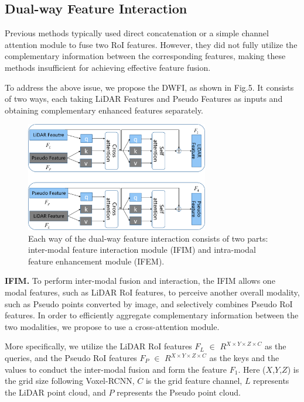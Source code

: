 \begin{sloppypar}
\subsection{Dual-way Feature Interaction}
Previous methods typically used direct concatenation or a simple channel attention module to fuse two RoI features. However, they did not fully utilize the complementary information between the corresponding features, making these methods insufficient for achieving effective feature fusion.

To address the above issue, we propose the DWFI, as shown in Fig.5. It consists of two ways, each taking LiDAR Features and Pseudo Features as inputs and obtaining complementary enhanced features separately.
\begin{figure}[h]
\centering
\includegraphics[width=8cm]{new_images/fig15.png}
\caption{Each way of the dual-way feature interaction consists of two parts: inter-modal feature interaction module (IFIM) and intra-modal feature enhancement module (IFEM).}
\label{fig_sim}
\end{figure}

{\bfseries IFIM.} To perform inter-modal fusion and interaction, the IFIM allows one modal features, such as LiDAR RoI features, to perceive another overall modality, such as Pseudo points converted by image, and selectively combines Pseudo RoI features. In order to efficiently aggregate complementary information between the two modalities, we propose to use a cross-attention module\cite{30}.

More specifically, we utilize the LiDAR RoI features  $F_L$ $\in$ $R^{X \times Y \times Z \times C}$ as the queries, and the Pseudo RoI features $F_P$ $\in$ $R^{X \times Y \times Z \times C}$ as the keys and the values to conduct the inter-modal fusion and form the feature $F_1$. Here ($X$,$Y$,$Z$) is the grid size following Voxel-RCNN\cite{21}, $C$ is the grid feature channel, $L$ represents the LiDAR point cloud, and $P$ represents the Pseudo point cloud.


\end{sloppypar}
